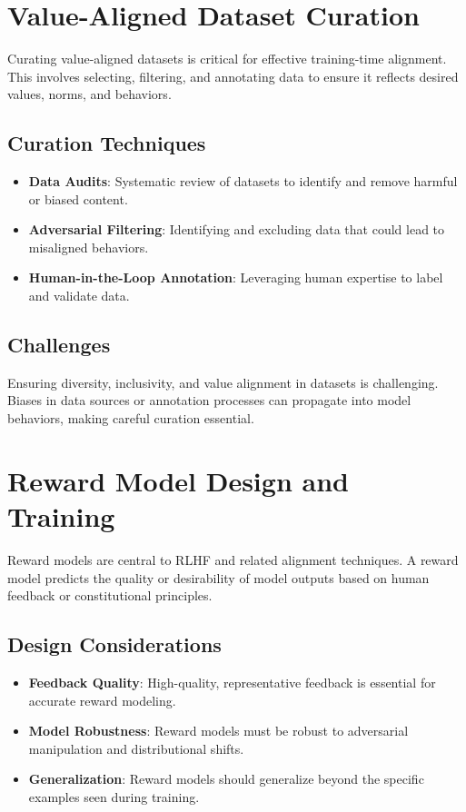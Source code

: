 \begin{TNtwocol}
\section{Value-Aligned Dataset Curation}
Curating value-aligned datasets is critical for effective training-time alignment. This involves selecting, filtering, and annotating data to ensure it reflects desired values, norms, and behaviors.

\subsection{Curation Techniques}
\begin{itemize}
    \item \textbf{Data Audits}: Systematic review of datasets to identify and remove harmful or biased content.
    \item \textbf{Adversarial Filtering}: Identifying and excluding data that could lead to misaligned behaviors.
    \item \textbf{Human-in-the-Loop Annotation}: Leveraging human expertise to label and validate data.
\end{itemize}

\subsection{Challenges}
Ensuring diversity, inclusivity, and value alignment in datasets is challenging. Biases in data sources or annotation processes can propagate into model behaviors, making careful curation essential.

\section{Reward Model Design and Training}
Reward models are central to RLHF and related alignment techniques. A reward model predicts the quality or desirability of model outputs based on human feedback or constitutional principles.

\subsection{Design Considerations}
\begin{itemize}
    \item \textbf{Feedback Quality}: High-quality, representative feedback is essential for accurate reward modeling.
    \item \textbf{Model Robustness}: Reward models must be robust to adversarial manipulation and distributional shifts.
    \item \textbf{Generalization}: Reward models should generalize beyond the specific examples seen during training.
\end{itemize}


\end{TNtwocol}
